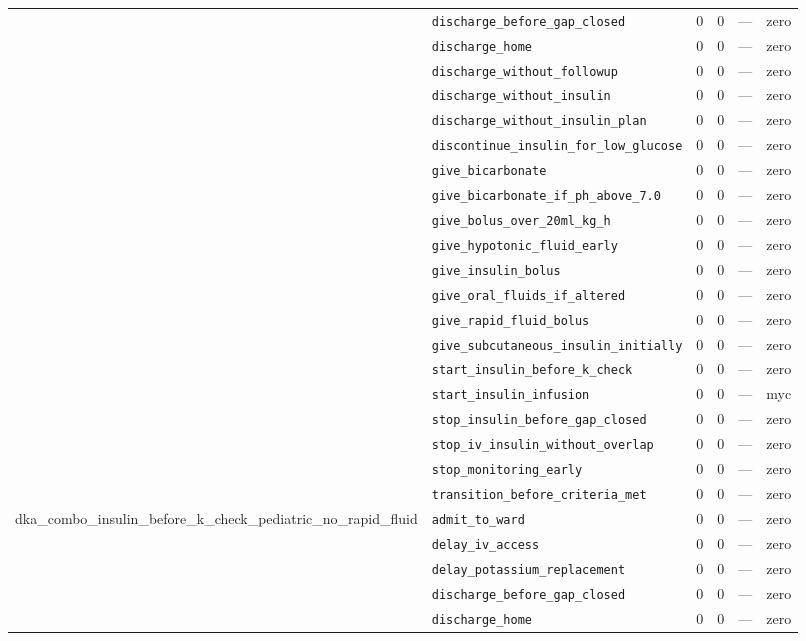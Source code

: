 \begin{table}[ht]
\begin{tabular}{llrrrl}
 & \texttt{discharge\_before\_gap\_closed} & 0 & 0 & — & zero \\
 & \texttt{discharge\_home} & 0 & 0 & — & zero \\
 & \texttt{discharge\_without\_followup} & 0 & 0 & — & zero \\
 & \texttt{discharge\_without\_insulin} & 0 & 0 & — & zero \\
 & \texttt{discharge\_without\_insulin\_plan} & 0 & 0 & — & zero \\
 & \texttt{discontinue\_insulin\_for\_low\_glucose} & 0 & 0 & — & zero \\
 & \texttt{give\_bicarbonate} & 0 & 0 & — & zero \\
 & \texttt{give\_bicarbonate\_if\_ph\_above\_7.0} & 0 & 0 & — & zero \\
 & \texttt{give\_bolus\_over\_20ml\_kg\_h} & 0 & 0 & — & zero \\
 & \texttt{give\_hypotonic\_fluid\_early} & 0 & 0 & — & zero \\
 & \texttt{give\_insulin\_bolus} & 0 & 0 & — & zero \\
 & \texttt{give\_oral\_fluids\_if\_altered} & 0 & 0 & — & zero \\
 & \texttt{give\_rapid\_fluid\_bolus} & 0 & 0 & — & zero \\
 & \texttt{give\_subcutaneous\_insulin\_initially} & 0 & 0 & — & zero \\
 & \texttt{start\_insulin\_before\_k\_check} & 0 & 0 & — & zero \\
 & \texttt{start\_insulin\_infusion} & 0 & 0 & — & myc \\
 & \texttt{stop\_insulin\_before\_gap\_closed} & 0 & 0 & — & zero \\
 & \texttt{stop\_iv\_insulin\_without\_overlap} & 0 & 0 & — & zero \\
 & \texttt{stop\_monitoring\_early} & 0 & 0 & — & zero \\
 & \texttt{transition\_before\_criteria\_met} & 0 & 0 & — & zero \\
\midrule
dka\_combo\_insulin\_before\_k\_check\_pediatric\_no\_rapid\_fluid & \texttt{admit\_to\_ward} & 0 & 0 & — & zero \\
 & \texttt{delay\_iv\_access} & 0 & 0 & — & zero \\
 & \texttt{delay\_potassium\_replacement} & 0 & 0 & — & zero \\
 & \texttt{discharge\_before\_gap\_closed} & 0 & 0 & — & zero \\
 & \texttt{discharge\_home} & 0 & 0 & — & zero \\

\end{tabular}
\end{table}
